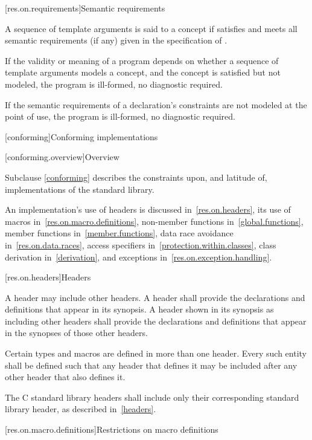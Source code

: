 [res.on.requirements]{Semantic requirements}

\pnum
A sequence  of template arguments is said to
%
 a concept 
if 
satisfies  and
meets all semantic requirements (if any)
given in the specification of .

\pnum
If the validity or meaning of a program
depends on whether a sequence of template arguments models a concept, and
the concept is satisfied but not modeled,
the program is ill-formed, no diagnostic required.

\pnum
If the semantic requirements of a declaration's
constraints are not modeled at the point of use,
the program is ill-formed, no diagnostic required.

[conforming]{Conforming implementations}

[conforming.overview]{Overview}

\pnum
Subclause \ref{conforming} describes the constraints upon, and latitude of, implementations of the \Cpp{} standard library.

\pnum
An implementation's use of headers is discussed in~\ref{res.on.headers}, its use
of macros in~\ref{res.on.macro.definitions}, non-member functions
in~\ref{global.functions}, member functions in~\ref{member.functions}, data race
avoidance in~\ref{res.on.data.races}, access specifiers
in~\ref{protection.within.classes}, class derivation in~\ref{derivation}, and
exceptions in~\ref{res.on.exception.handling}.

[res.on.headers]{Headers}

\pnum
A \Cpp{} header may include other \Cpp{} headers.
A \Cpp{} header shall provide the declarations and definitions that appear in its
synopsis. A \Cpp{} header shown in its synopsis as including other \Cpp{} headers
shall provide the declarations and definitions that appear in the synopses of
those other headers.

\pnum
Certain types and macros are defined in more than one header.
Every such entity shall be defined such that any header that defines it may be
included after any other header that also defines it.

\pnum
The C standard library headers
shall include only their corresponding \Cpp{} standard library header,
as described in~\ref{headers}.

[res.on.macro.definitions]{Restrictions on macro definitions}
%

